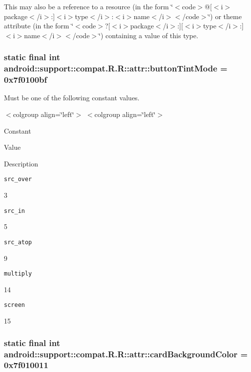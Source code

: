This may also be a reference to a resource (in the form \char`\"{}$<$code$>$@\mbox{[}$<$i$>$package$<$/i$>$:\mbox{]}$<$i$>$type$<$/i$>$:$<$i$>$name$<$/i$>$$<$/code$>$\char`\"{}) or theme attribute (in the form \char`\"{}$<$code$>$?\mbox{[}$<$i$>$package$<$/i$>$:\mbox{]}\mbox{[}$<$i$>$type$<$/i$>$:\mbox{]}$<$i$>$name$<$/i$>$$<$/code$>$\char`\"{}) containing a value of this type. \hypertarget{classandroid_1_1support_1_1compat_1_1_r_1_1attr_5ce8f8a2aa479b249cd052670b47b8f2}{
\subsubsection[{buttonTintMode}]{\setlength{\rightskip}{0pt plus 5cm}static final int android::support::compat.R.R::attr::buttonTintMode = 0x7f0100bf}}
\label{classandroid_1_1support_1_1compat_1_1_r_1_1attr_5ce8f8a2aa479b249cd052670b47b8f2}


Must be one of the following constant values. \begin{TabularC}{0}
\hline
\end{TabularC}
$<$colgroup align=\char`\"{}left\char`\"{}$>$ $<$colgroup align=\char`\"{}left\char`\"{}$>$ 

Constant

Value

Description 

{\tt src\_\-over}

3

{\tt src\_\-in}

5

{\tt src\_\-atop}

9

{\tt multiply}

14

{\tt screen}

15\hypertarget{classandroid_1_1support_1_1compat_1_1_r_1_1attr_ef6363e22f2cda3fc304148a92a61455}{
\subsubsection[{cardBackgroundColor}]{\setlength{\rightskip}{0pt plus 5cm}static final int android::support::compat.R.R::attr::cardBackgroundColor = 0x7f010011}}
\label{classandroid_1_1support_1_1compat_1_1_r_1_1attr_ef6363e22f2cda3fc304148a92a61455}


